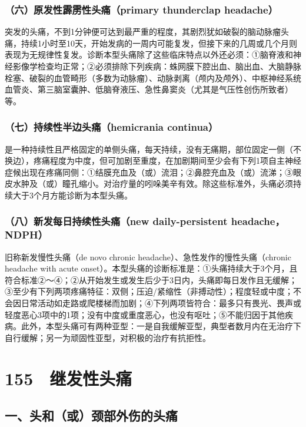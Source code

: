 \subsubsection{（六）原发性霹雳性头痛（primary thunderclap headache）}

突发的头痛，不到1分钟便可达到最严重的程度，其剧烈犹如破裂的脑动脉瘤头痛，持续1小时至10天，开始发病的一周内可能复发，但接下来的几周或几个月则表现为无规律性复发。诊断本型头痛除了这些临床特点以外还必须：①脑脊液和神经影像学检查均正常；②必须排除下列疾病：蛛网膜下腔出血、脑出血、大脑静脉栓塞、破裂的血管畸形（多数为动脉瘤）、动脉剥离（颅内及颅外）、中枢神经系统血管炎、第三脑室囊肿、低脑脊液压、急性鼻窦炎（尤其是气压性创伤所致者）等。

\subsubsection{（七）持续性半边头痛（hemicrania continua）}

是一种持续性且严格固定的单侧头痛，每天持续，没有无痛期，部位固定一侧（不换边），疼痛程度为中度，但可加剧至重度，在加剧期间至少会有下列1项自主神经症候出现在疼痛同侧：①结膜充血及（或）流泪；②鼻腔充血及（或）流涕；③眼皮水肿及（或）瞳孔缩小。对治疗量的吲哚美辛有效。除这些标准外，头痛必须持续大于3个月方能诊断为本型头痛。

\subsubsection{（八）新发每日持续性头痛（new daily-persistent headache，NDPH）}

旧称新发慢性头痛（de novo chronic
headache）、急性发作的慢性头痛（chronic headache with acute
onset）。本型头痛的诊断标准是：①头痛持续大于3个月，且符合标准②～④；②从开始发生或发生后少于3日内，头痛即每日发作且无缓解；③至少有下列两项疼痛特征：双侧；压迫/紧缩性（非搏动性）；程度轻或中度；不会因日常活动如走路或爬楼梯而加剧；④下列两项皆符合：最多只有畏光、畏声或轻度恶心3项中的1项；没有中度或重度恶心，也没有呕吐；⑤不能归因于其他疾病。此外，本型头痛可有两种亚型：一是自我缓解亚型，典型者数月内在无治疗下自行缓解；另一为顽固性亚型，对积极的治疗有抗拒性。

\protect\hypertarget{text00352.html}{}{}

\section{155　继发性头痛}

\subsection{一、头和（或）颈部外伤的头痛}

